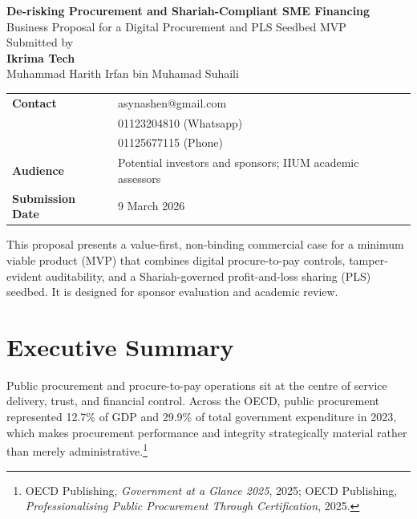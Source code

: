 \documentclass[11pt,a4paper]{article}
\begin{document}
\begin{titlepage}
    \centering
    \vspace*{2.0cm}
    {\LARGE \textbf{De-risking Procurement and Shariah-Compliant SME Financing}}\\[0.4cm]
    {\Large Business Proposal for a Digital Procurement and PLS Seedbed MVP}\\[1.2cm]

    {\large Submitted by}\\[0.2cm]
    {\Large \textbf{Ikrima Tech}}\\[0.3cm]
    {\large Muhammad Harith Irfan bin Muhamad Suhaili}\\[1.0cm]

    \begin{tabular}{>{\bfseries}p{4cm}p{9cm}}
    Contact & asynashen@gmail.com \\
            & 01123204810 (Whatsapp) \\
            & 01125677115 (Phone) \\
    Audience & Potential investors and sponsors; IIUM academic assessors \\
    Submission Date & 9 March 2026 \\
    \end{tabular}

    \vfill

    \begin{minipage}{0.9\textwidth}
    \small
    This proposal presents a value-first, non-binding commercial case for a minimum viable product (MVP) that combines digital procure-to-pay controls, tamper-evident auditability, and a Shariah-governed profit-and-loss sharing (PLS) seedbed. It is designed for sponsor evaluation and academic review.
    \end{minipage}
\end{titlepage}

\tableofcontents
\newpage

\section{Executive Summary}

Public procurement and procure-to-pay operations sit at the centre of service delivery, trust, and financial control. Across the OECD, public procurement represented 12.7\% of GDP and 29.9\% of total government expenditure in 2023, which makes procurement performance and integrity strategically material rather than merely administrative.\footnote{OECD Publishing, \emph{Government at a Glance 2025}, 2025; OECD Publishing, \emph{Professionalising Public Procurement Through Certification}, 2025.}
\end{document}
